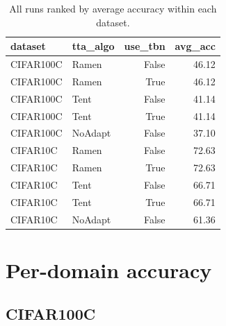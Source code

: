 \documentclass[11pt]{article}
\begin{document}
\begin{table}[H]
\centering
\small
\begin{tabular}{llrr}
\toprule
dataset & tta\_algo & use\_tbn & avg\_acc \\
\midrule
CIFAR100C & Ramen & False & 46.12 \\
CIFAR100C & Ramen & True & 46.12 \\
CIFAR100C & Tent & False & 41.14 \\
CIFAR100C & Tent & True & 41.14 \\
CIFAR100C & NoAdapt & False & 37.10 \\
CIFAR10C & Ramen & False & 72.63 \\
CIFAR10C & Ramen & True & 72.63 \\
CIFAR10C & Tent & False & 66.71 \\
CIFAR10C & Tent & True & 66.71 \\
CIFAR10C & NoAdapt & False & 61.36 \\
\bottomrule
\end{tabular}

\caption{All runs ranked by average accuracy within each dataset.}
\end{table}

\section{Per-domain accuracy}

\subsection*{CIFAR100C}
\end{document}
